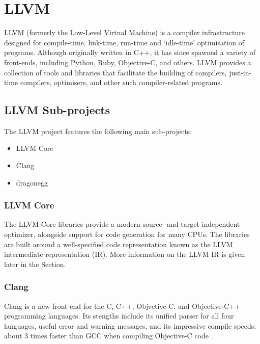 \section{LLVM}
\label{sec:llvm}

LLVM (formerly the Low-Level Virtual Machine\footnotemark {}) is a compiler infrastructure designed for compile-time, link-time, run-time and `idle-time' optimisation of programs.  Although originally written in C++, it has since spawned a variety of front-ends, including Python, Ruby, Objective-C, and others. LLVM provides a collection of tools and libraries that facilitate the building of compilers, just-in-time compilers, optimisers, and other such compiler-related programs.

\subsection*{LLVM Sub-projects}

The LLVM project features the following main sub-projects:

\begin{itemize}
\item LLVM Core
\item Clang
\item dragonegg
\end{itemize}

\subsubsection*{LLVM Core}

The LLVM Core libraries provide a modern source- and target-independent optimizer, alongside support for code generation for many CPUs. The libraries are built around a well-specified code representation known as the LLVM intermediate representation (IR). More information on the LLVM IR is given later in the Section.

\subsubsection*{Clang}

Clang is a new front-end for the C, C++, Objective-C, and Objective-C++ programming languages. Its stengths include its unified parser for all four languages, useful error and warning messages, and its impressive compile speeds: about 3 times faster than GCC when compiling Objective-C code \cite{clang_performance}.


